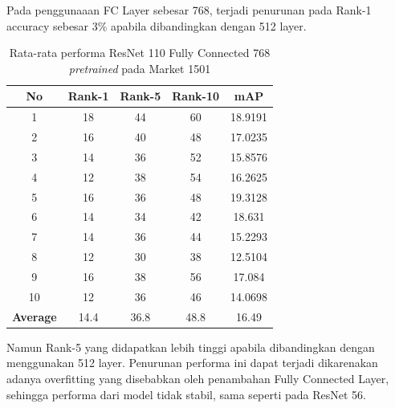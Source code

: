 Pada penggunaaan FC Layer sebesar 768, terjadi penurunan pada Rank-1 accuracy sebesar 3\% apabila dibandingkan dengan 512 layer.
\begin{longtable}{|c|c|c|c|c|}
	\caption{Rata-rata performa ResNet 110 Fully Connected 768 \textit{pretrained} pada Market 1501 }
	\label{tabel: 16}\\
	\hline
	\rowcolor[HTML]{C0C0C0}
	\textbf{No} &\textbf{Rank-1} & \textbf{Rank-5} & \textbf{Rank-10} & \textbf{mAP} \\
	\hline
	1 &18 &44 &60 &18.9191 \\
	2 &16 &40 &48 &17.0235 \\
	3 &14 &36 &52 &15.8576 \\
	4 &12 &38 &54 &16.2625 \\
	5 &16 &36 &48 &19.3128 \\
	6 &14 &34 &42 &18.631 \\
	7 &14 &36 &44 &15.2293 \\
	8 &12 &30 &38 &12.5104 \\
	9 &16 &38 &56 &17.084 \\
	10 &12 &36 &46 &14.0698 \\
	\hline
	\textbf{Average} & 14.4 & 36.8 & 48.8 &16.49 \\
	\hline
\end{longtable}
 Namun Rank-5 yang didapatkan lebih tinggi apabila dibandingkan dengan menggunakan 512 layer. Penurunan performa ini dapat terjadi dikarenakan adanya overfitting yang disebabkan oleh penambahan Fully Connected Layer, sehingga performa dari model tidak stabil, sama seperti pada ResNet 56.

